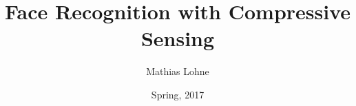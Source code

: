 \documentclass[a4paper, article, oneside, USenglish, hidelinks]{memoir}
\title{Face Recognition with Compressive Sensing}
\author{Mathias Lohne}
\date{Spring, 2017}
\makeatletter
\let\origchapter\chapter
\renewcommand\chapter{\@ifstar{\starchapter}{\nostarchapter}}
\newcommand\nostarchapter[1]
{\chapterprelude\origchapter{#1}\chapterpostlude}
\newcommand\starchapter[1]
{\chapterprelude\origchapter*{#1}\chapterpostlude}
\newcommand\chapterprelude{%
	\vspace{2.5em}
}
\newcommand\chapterpostlude{%
}
\let\origsection\section
\renewcommand\section{\@ifstar{\starsection}{\nostarsection}}
\newcommand\nostarsection[1]
{\sectionprelude\origsection{#1}\sectionpostlude}
\newcommand\starsection[1]
{\sectionprelude\origsection*{#1}\sectionpostlude}
\newcommand\sectionprelude{%
	\vspace{1.5em}
}
\newcommand\sectionpostlude{%
}
\newcommand{\pythonimport}[1]{
	
}
\newcommand{\0}{\mathbf{0}}
\newcommand{\1}{\mathbf{1}}
\makeatother
\begin{document}
\maketitle

\begin{abstract}
    \noindent
\end{abstract}

\begin{KeepFromToc}
\end{KeepFromToc}









\printbibliography

\end{document}
